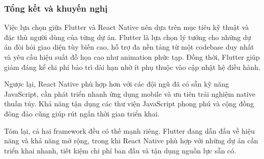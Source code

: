 \subsubsection{Tổng kết và khuyến nghị}

\begin{flushleft}
    \hspace*{0.8cm}Việc lựa chọn giữa Flutter và React Native nên dựa trên mục tiêu kỹ thuật và đặc thù người dùng của từng dự án. Flutter là lựa chọn lý tưởng cho những dự án đòi hỏi giao diện tùy biến cao, hỗ trợ đa nền tảng từ một codebase duy nhất và yêu cầu hiệu suất đồ họa cao như animation phức tạp. Đồng thời, Flutter giúp giảm đáng kể chi phí bảo trì dài hạn nhờ ít phụ thuộc vào cập nhật hệ điều hành.

    \vspace{0.5em}

    \hspace*{1.5em}Ngược lại, React Native phù hợp hơn với các đội ngũ đã có sẵn kỹ năng JavaScript, cần phát triển nhanh ứng dụng mobile và ưu tiên trải nghiệm native thuần túy. Khả năng tận dụng các thư viện JavaScript phong phú và cộng đồng đông đảo cũng giúp rút ngắn thời gian triển khai.

    \vspace{0.5em}

    \hspace*{1.5em}Tóm lại, cả hai framework đều có thế mạnh riêng. Flutter đang dẫn đầu về hiệu năng và khả năng mở rộng, trong khi React Native phù hợp với những dự án cần triển khai nhanh, tiết kiệm chi phí ban đầu và tận dụng nguồn lực sẵn có.
\end{flushleft}